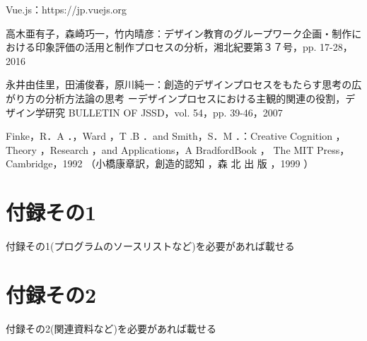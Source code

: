 \documentclass{funthesis}
\begin{document}
\begin{thebibliography}{9}
Vue.js：https://jp.vuejs.org

高木亜有子，森崎巧一，竹内晴彦：デザイン教育のグループワーク企画・制作における印象評価の活用と制作プロセスの分析，湘北紀要第３７号，pp. 17-28，2016

永井由佳里，田浦俊春，原川純一：創造的デザインプロセスをもたらす思考の広がり方の分析方法論の思考 ーデザインプロセスにおける主観的関連の役割，デザイン学研究 BULLETIN OF JSSD，vol. 54，pp. 39-46，2007

Finke，R．A ．，Ward ，T .B ．and Smith，S．M ．：Creative Cognition ， Theory ，Research ，and
Applications，A BradfordBook ， The MIT Press，
Cambridge，1992 （小橋康章訳，創造的認知 ，森 北 出
版 ，1999 ）






\end{thebibliography}


\appendix

\chapter*{付録その1} %

付録その1(プログラムのソースリストなど)を必要があれば載せる

\chapter*{付録その2}

付録その2(関連資料など)を必要があれば載せる

\listoffigures

\listoftables
\end{document}
